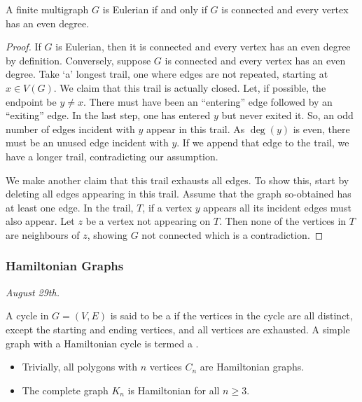 \begin{theorem}
    A finite multigraph $G$ is Eulerian if and only if $G$ is connected and every vertex has an even degree.
\end{theorem}
\begin{proof}
    If $G$ is Eulerian, then it is connected and every vertex has an even degree by definition. Conversely, suppose $G$ is connected and every vertex has an even degree. Take `a' longest trail, one where edges are not repeated, starting at $x \in V(G)$. We claim that this trail is actually closed. Let, if possible, the endpoint be $y \neq x$. There must have been an ``entering'' edge followed by an ``exiting'' edge. In the last step, one has entered $y$ but never exited it. So, an odd number of edges incident with $y$ appear in this trail. As $\deg(y)$ is even, there must be an unused edge incident with $y$. If we append that edge to the trail, we have a longer trail, contradicting our assumption.

    We make another claim that this trail exhausts all edges. To show this, start by deleting all edges appearing in this trail. Assume that the graph so-obtained has at least one edge. In the trail, $T$, if a vertex $y$ appears all its incident edges must also appear. Let $z$ be a vertex not appearing on $T$. Then none of the vertices in $T$ are neighbours of $z$, showing $G$ not connected which is a contradiction.
\end{proof}


\subsubsection{Hamiltonian Graphs}
\textit{August 29th.}

\begin{definition}
    A cycle in $G = (V,E)$ is said to be a  if the vertices in the cycle are all distinct, except the starting and ending vertices, and all vertices are exhausted. A simple graph with a Hamiltonian cycle is termed a .
\end{definition}

\begin{example}
    \begin{itemize}
        \item Trivially, all polygons with $n$ vertices $C_{n}$ are Hamiltonian graphs.
        \item The complete graph $K_{n}$ is Hamiltonian for all $n \geq 3$.
    \end{itemize}
\end{example}

